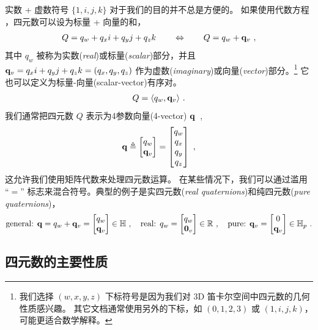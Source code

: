 实数 + 虚数符号 $\{1,i,j,k\}$ 对于我们的目的并不总是方便的。 
%
%
如果使用代数方程  ，四元数可以设为标量 + 向量的和，
%
\begin{align}
Q=q_w+q_xi+q_yj+q_zk
\qquad
\Leftrightarrow
\qquad
Q = q_w + {\bf q}_v~,
\end{align}
%
其中 $q_w$ 被称为实数(\emph{real})或标量(\emph{scalar})部分，并且 ${\bf q}_v=q_x i+q_y j+q_z k=(q_x,q_y,q_z)$ 作为虚数(\emph{imaginary})或向量(\emph{vector})部分。\footnote{\label{ftn:quatComponents}我们选择 $(w,x,y,z)$ 下标符号是因为我们对 3D 笛卡尔空间中四元数的几何性质感兴趣。 
其它文档通常使用另外的下标，如 $(0,1,2,3)$ 或 $(1,i,j,k)$，可能更适合数学解释。}%
它也可以定义为标量-向量(scalar-vector)有序对。 
%
\begin{align}
Q = \langle q_w,{\bf q}_v\rangle ~.
\end{align}
%
我们通常把四元数 $Q$ 表示为4参数向量(4-vector) ${\bf q}$~,
%
\begin{align}
{\bf q} \triangleq 
\begin{bmatrix}
q_w\\{\bf q}_v
\end{bmatrix}=
\begin{bmatrix}
q_w\\q_x\\q_y\\q_z
\end{bmatrix}~,
\end{align}%
%
这允许我们使用矩阵代数来处理四元数运算。
在某些情况下，我们可以通过滥用 ``$=$'' 标志来混合符号。典型的例子是实四元数(\emph{real quaternions})和纯四元数(\emph{pure quaternions})，
%
\begin{align}
\textrm{general: }
{\bf q}
=q_w+{\bf q}_v=\begin{bmatrix}
q_w\\{\bf q}_v
\end{bmatrix} \in {\mathbb H}
~,\quad
\textrm{real: }
q_w=\begin{bmatrix}
q_w\\{\bf0}_v
\end{bmatrix} \in {\mathbb R}
~,\quad
\textrm{pure: }
{\bf q}_v=\begin{bmatrix}
0\\{\bf q}_v
\end{bmatrix} \in {\mathbb H}_p
~.
\end{align}




\subsection{四元数的主要性质}

